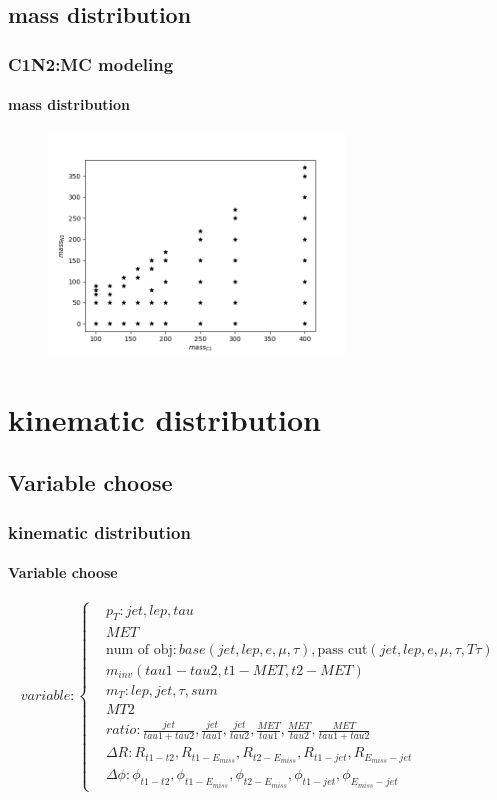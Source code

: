 \documentclass[usenames,dvipsnames]{beamer}
\begin{document}
\subsection{mass distribution}
\begin{frame}
	\frametitle{C1N2:MC modeling}
	\framesubtitle{mass distribution}
	\begin{figure}
		\centering
		\includegraphics[width = 0.7\textwidth]{graphics/mass.png}
	\end{figure}
\end{frame}

\section{kinematic distribution}
\subsection{Variable choose}
\begin{frame}
	\frametitle{kinematic distribution}
	\framesubtitle{Variable choose}
		\begin{equation*}
		variable:
		\left\{
		\begin{split}
			& p_T:jet,lep,tau\\
      & MET\\
			& \text{num of obj}:base(jet,lep,e,\mu,\tau),\text{pass cut}(jet,lep,e,\mu,\tau,T\tau)\\
			& m_{inv}(tau1-tau2,t1-MET,t2-MET)\\
			& m_T:lep,jet,\tau,sum\\
			& MT2\\
			& ratio: \frac{jet}{tau1+tau2},\frac{jet}{tau1},\frac{jet}{tau2},\frac{MET}{tau1},\frac{MET}{tau2},\frac{MET}{tau1+tau2}\\
			& \Delta R: R_{t1-t2},R_{t1-E_{miss}},R_{t2-E_{miss}}, R_{t1-jet},R_{E_{miss}-jet}\\
			& \Delta \phi:\phi_{t1-t2},\phi_{t1-E_{miss}},\phi_{t2-E_{miss}}, \phi_{t1-jet},\phi_{E_{miss}-jet}
		\end{split}
		\right.
		\end{equation*}
\end{frame}
\end{document}
